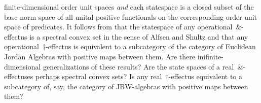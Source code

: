 \documentclass[b]{subfiles}
\begin{document}
\begin{parsec}
\begin{point}
\begin{point}
        finite-dimensional order unit spaces
        \emph{and} each statespace is a closed subset
        of the base norm space of all
        unital positive functionals on the corresponding
        order unit space of predicates.
It follows from \cite{wetering}
    that the statespace of any operational~$\&$-effectus
    is a spectral convex set in the sense of Alfsen and Shultz
    and that any operational~$\dagger$-effectus
    is equivalent to a subcategory of the category of Euclidean Jordan Algebras
    with positive maps between them.
Are there inifinite-dimensional generalizations of these results?
Are the state spaces of a real~$\&$-effectuses perhaps
    spectral convex sets?
Is any real~$\dagger$-effectus equivalent to a subcategory of, say,
    the category of JBW-algebras with positive maps between them?
\end{point}
\end{point}
\end{parsec}
\end{document}
